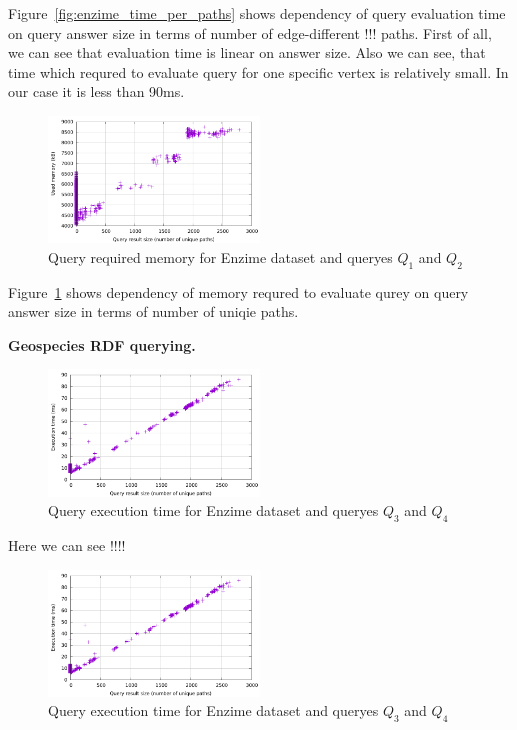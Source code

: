 Figure~\ref{fig:enzime_time_per_paths} shows dependency of query evaluation time on query answer size in terms of number of edge-different !!! paths.
First of all, we can see that evaluation time is linear on answer size.
Also we can see, that time which requred to evaluate query for one specific vertex is relatively small.
In our case it is less than 90ms.

\begin{figure}[ht]
  \begin{center}
    \includegraphics[width=0.5\textwidth]{data/enzime_narrowerTr_mem_per_paths.pdf}
    \caption{Query required memory for Enzime dataset and queryes $Q_1$ and $Q_2$}
    \label{fig:enzime_mem_per_paths}
  \end{center}
\end{figure}

Figure~\ref{fig:enzime_mem_per_paths} shows dependency of memory requred to evaluate qurey on query answer size in terms of number of uniqie paths.


\textbf{Geospecies RDF querying.}

\begin{figure}[ht]
  \begin{center}
    \includegraphics[width=0.5\textwidth]{data/enzime_narrowerTr_time_per_paths.pdf}
    \caption{Query execution time for Enzime dataset and queryes $Q_3$ and $Q_4$}
    \label{fig:geo_time_per_paths}
  \end{center}
\end{figure}

Here we can see !!!!

\begin{figure}[ht]
  \begin{center}
    \includegraphics[width=0.5\textwidth]{data/enzime_narrowerTr_time_per_paths.pdf}
    \caption{Query execution time for Enzime dataset and queryes $Q_3$ and $Q_4$}
    \label{fig:geo_time_per_paths}
  \end{center}
\end{figure}

